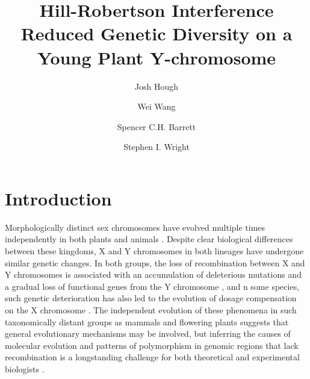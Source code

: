 \documentclass[9pt,twocolumn,twoside,lineno]{gsajnl}
\title{Hill-Robertson Interference Reduced Genetic Diversity on a Young Plant Y-chromosome}
\author[$\ast$,$\dagger$,1]{Josh Hough}
\author[$\dagger$]{Wei Wang}
\author[$\dagger$]{Spencer C.H. Barrett}
\author[$\dagger$]{Stephen I. Wright}
\affil[$\ast$]{Department of Plant Sciences, University of California, Davis}
\affil[$\dagger$]{Department of Ecology and Evolutionary Biology, University of Toronto}
\begin{document}
\maketitle
\thispagestyle{firststyle}
\marginmark
\firstpagefootnote
{}
\vspace{-11pt}

\section*{Introduction}

\lettrine[lines=2]{\color{color2}M}{}orphologically distinct sex chromosomes have evolved multiple times independently in both plants and animals \citep{westergaard1958,ohno1967,bull1983,charlesworth1991,charlesworth2015plant}. Despite clear biological differences between these kingdoms, X and Y chromosomes in both lineages have undergone similar genetic changes. In both groups, the loss of recombination between X and Y chromosomes is associated with an accumulation of deleterious mutations and a gradual loss of functional genes from the Y chromosome \citep{hough2014,bergero2015,bachtrog2013NRG}, and n some species, such genetic deterioration has also led to the evolution of dosage compensation on the X chromosome \citep{charlesworth1996CB,muyle2012,mank2013sex,papadopulos2015}. The independent evolution of these phenomena in such taxonomically distant groups as mammals and flowering plants suggests that general evolutionary mechanisms may be involved, but inferring the causes of molecular evolution and patterns of polymorphism in genomic regions that lack recombination is a longstanding challenge for both theoretical and experimental biologists \citep{charlesworth1978,feldman1980evolution,barton1995general,charlesworth1996CB,otto1997deleterious,charlesworth2000degeneration,mcvean2000effects}.
\end{document}
